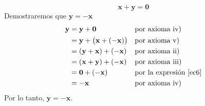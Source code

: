 \begin{theorem}{}{}
\begin{equation}
        \mathbf{x} + \mathbf{y} = \mathbf{0} \label{ec6}
    \end{equation}
    Demostraremos que $\mathbf{y} = -\mathbf{x}$
    \begin{align*}
        \mathbf{y} & = \mathbf{y} + \mathbf{0} && \text{por axioma iv)} \\
        & = \mathbf{y} + \big( \mathbf{x} + (-\mathbf{x}) \big) && \text{por axioma v)} \\
        & = (\mathbf{y} + \mathbf{x}) + (-\mathbf{x}) && \text{por axioma ii)} \\
        & = (\mathbf{x} + \mathbf{y}) + (-\mathbf{x}) && \text{por axioma iii)} \\
        & = \mathbf{0} + (-\mathbf{x}) && \text{por la expresión \eqref{ec6}} \\
        & = -\mathbf{x} && \text{por axioma iv)}
    \end{align*}
    Por lo tanto, $\mathbf{y} = -\mathbf{x}$.
\end{theorem}

\newpage

